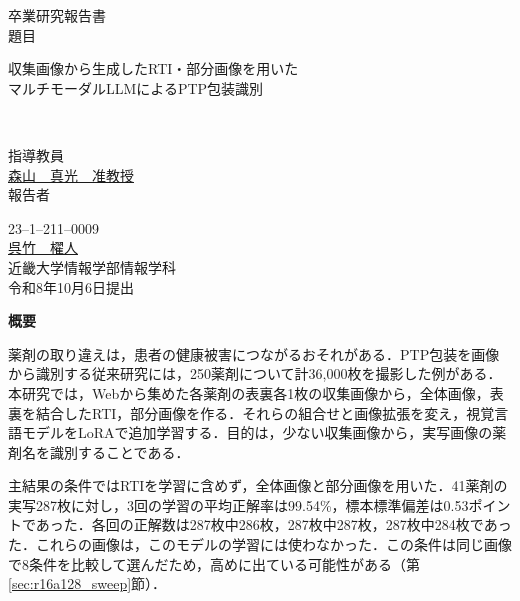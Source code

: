 \documentclass[uplatex,dvipdfmx]{jsarticle}
\begin{document}
\pagestyle{empty}

\begin{center}
\vspace*{1cm}
\large
{\LARGE 卒業研究報告書}\\
\vspace*{0.8cm}
題目\\
\vspace*{1cm}
\parbox{15.5cm}{\centering\LARGE
収集画像から生成したRTI・部分画像を用いた\\[2mm]
マルチモーダルLLMによるPTP包装識別}\\
\vspace{3mm}

\vspace*{3cm}
指導教員\\
\vspace*{0.3cm}
\underline{\LARGE 森山　真光　准教授}\\
\vspace*{3cm}
報告者\\
\vspace*{0.3cm}

{23--1--211--0009}\\
\vspace*{0.3cm}
\underline{\Huge 呉竹　櫂人}\\
\vspace*{0.5cm}
近畿大学情報学部情報学科\\
\vspace*{2cm}
令和8年10月6日提出\\
\end{center}

\newpage
\normalsize


\clearpage
\begin{center}
{\bf \Large 概要}
\end{center}

薬剤の取り違えは，患者の健康被害につながるおそれがある．PTP包装を画像から識別する従来研究には，250薬剤について計36,000枚を撮影した例がある\cite{han2021blister}．本研究では，Webから集めた各薬剤の表裏各1枚の収集画像から，全体画像，表裏を結合したRTI，部分画像を作る．それらの組合せと画像拡張を変え，視覚言語モデルをLoRAで追加学習する．目的は，少ない収集画像から，実写画像の薬剤名を識別することである．

主結果の条件ではRTIを学習に含めず，全体画像と部分画像を用いた．41薬剤の実写287枚に対し，3回の学習の平均正解率は99.54\%，標本標準偏差は0.53ポイントであった．各回の正解数は287枚中286枚，287枚中287枚，287枚中284枚であった．これらの画像は，このモデルの学習には使わなかった．この条件は同じ画像で8条件を比較して選んだため，高めに出ている可能性がある（第\ref{sec:r16a128_sweep}節）．
\end{document}
